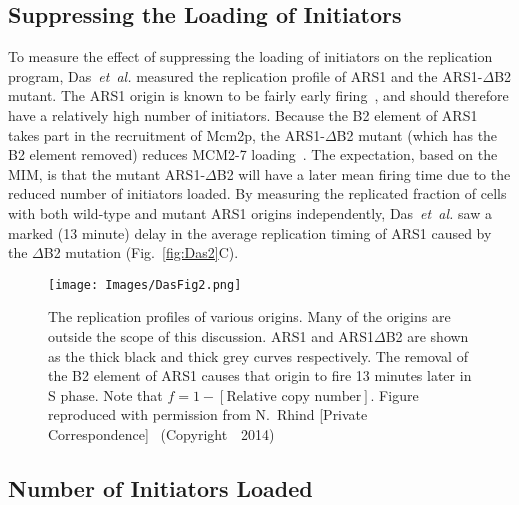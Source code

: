 {		
		\subsection{Suppressing the Loading of Initiators}
		\label{subsec:SuppressingInitiators}
		
		To measure the effect of suppressing the loading of initiators on the replication program, Das~\emph{et~al.} measured the replication profile of ARS1 and the ARS1-$\Delta$B2 mutant.
		The ARS1 origin is known to be fairly early firing~\cite{OriDB}, and should therefore have a relatively high number of initiators.
		Because the B2 element of ARS1 takes part in the recruitment of Mcm2p, the ARS1-$\Delta$B2 mutant (which has the B2 element removed) reduces MCM2-7 loading~\cite{ARS1Mutant}.
		The expectation, based on the MIM, is that the mutant ARS1-$\Delta$B2 will have a later mean firing time due to the reduced number of initiators loaded.
		By measuring the replicated fraction of cells with both wild-type and mutant ARS1 origins independently, Das~\emph{et~al.} saw a marked (13 minute) delay in the average replication timing of ARS1 caused by the $\Delta$B2 mutation (Fig.~\ref{fig:Das2}C).
		
		\begin{figure}[1][tbh]
			\begin{center}
				\texttt{[image: Images/DasFig2.png]}
			\end{center}
				\caption[Replication profile of various origins]{\label{fig:Das1} The replication profiles of various origins.
					Many of the origins are outside the scope of this discussion.
					ARS1 and ARS1$\Delta$B2 are shown as the thick black and thick grey curves respectively.
					The removal of the B2 element of ARS1 causes that origin to fire 13 minutes later in S phase.
					Note that $f = 1 - [\text{Relative copy number}]$.
					Figure reproduced with permission from N.~Rhind [Private Correspondence]~\cite{Rhind} (Copyright~\textcopyright~2014)}
		\end{figure}
\clearpage
		
		
		\subsection{Number of Initiators Loaded}
		\label{subsec:NoInitiatorsLoaded}
		
}
